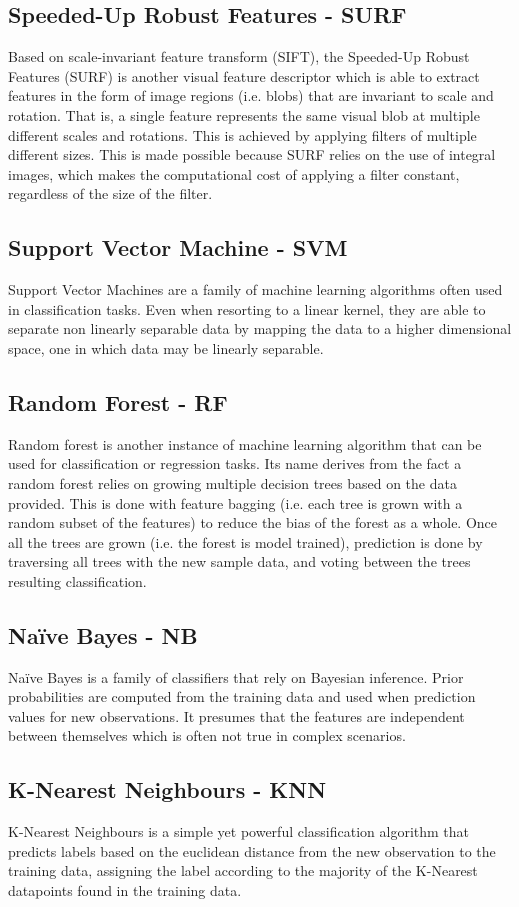 \documentclass[11pt]{article}
\begin{document}
    \subsection{Speeded-Up Robust Features - SURF}
        Based on scale-invariant feature transform (SIFT), the Speeded-Up Robust Features (SURF) is another visual feature descriptor which is able to extract features in the form of image regions (i.e. blobs) that are invariant to scale and rotation. That is, a single feature represents the same visual blob at multiple different scales and rotations. This is achieved by applying filters of multiple different sizes. This is made possible because SURF relies on the use of integral images, which makes the computational cost of applying a filter constant, regardless of the size of the filter.
    \subsection{Support Vector Machine - SVM}
        Support Vector Machines are a family of machine learning algorithms often used in classification tasks. Even when resorting to a linear kernel, they are able to separate non linearly separable data by mapping the data to a higher dimensional space, one in which data may be linearly separable.
    \subsection{Random Forest - RF}
        Random forest is another instance of machine learning algorithm that can be used for classification or regression tasks. Its name derives from the fact a random forest relies on growing multiple decision trees based on the data provided. This is done with feature bagging (i.e. each tree is grown with a random subset of the features) to reduce the bias of the forest as a whole. Once all the trees are grown (i.e. the forest is model trained), prediction is done by traversing all trees with the new sample data, and voting between the trees resulting classification.
    \subsection{Naïve Bayes - NB}
        Naïve Bayes is a family of classifiers that rely on Bayesian inference. Prior probabilities are computed from the training data and used when prediction values for new observations. It presumes that the features are independent between themselves which is often not true in complex scenarios.
    \subsection{K-Nearest Neighbours - KNN}
        K-Nearest Neighbours is a simple yet powerful classification algorithm that predicts labels based on the euclidean distance from the new observation to the training data, assigning the label according to the majority of the K-Nearest datapoints found in the training data.
\end{document}
